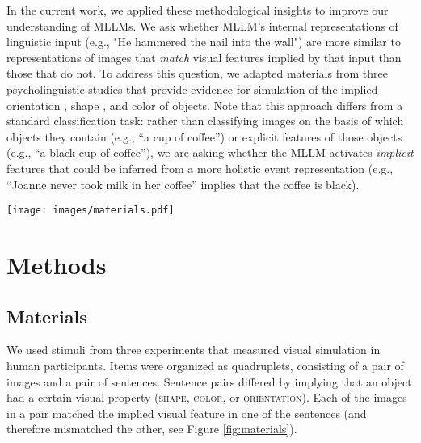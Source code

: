 \documentclass[10pt, a4paper]{article}
\begin{document}
In the current work, we applied these methodological insights to improve our understanding of MLLMs. We ask whether MLLM's internal representations of linguistic input (e.g., "He hammered the nail into the wall") are more similar to representations of images that \textit{match} visual features implied by that input than those that do not. To address this question, we adapted materials from three psycholinguistic studies that provide evidence for simulation of the implied orientation \cite{stanfield2001effect}, shape \cite{pecher2009short}, and color \cite{connell2007representing} of objects. Note that this approach differs from a standard classification task: rather than classifying images on the basis of which objects they contain (e.g., ``a cup of coffee'') or explicit features of those objects (e.g., ``a black cup of coffee''), we are asking whether the MLLM activates \textit{implicit} features that could be inferred from a more holistic event representation (e.g., ``Joanne never took milk in her coffee'' implies that the coffee is black). 

\begin{figure*}[ht]
    \texttt{[image: images/materials.pdf]}
    \label{fig:materials}
    \caption{The dataset consisted of pairs of sentences and images, forming quadruplets. Each sentence in a pair implied that an object had a certain visual property (e.g. brown color). Each implied visual property was matched by one of the pair of images. The implied visual properties included \textsc{shape} \citep[\textbf{Left, }][]{pecher2009short}, \textsc{color} \citep[\textbf{Center}, ][]{connell2007representing}, and \textsc{orientation} \citep[\textbf{Right}, ][]{stanfield2001effect}.
    }
\end{figure*}

\section{Methods}

\subsection{Materials}

We used stimuli from three experiments that measured visual simulation in human participants. Items were organized as quadruplets, consisting of a pair of images and a pair of sentences.
Sentence pairs differed by implying that an object had a certain visual property (\textsc{shape}, \textsc{color}, or \textsc{orientation}).
Each of the images in a pair matched the implied visual feature in one of the sentences (and therefore mismatched the other, see Figure \ref{fig:materials}).
\end{document}
